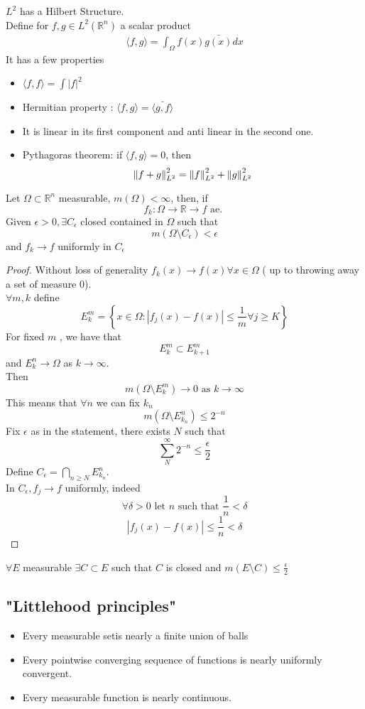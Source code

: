 \documentclass[../main.tex]{subfiles}
\begin{document}
\begin{rmq}
$L^{2}$ has a Hilbert Structure.\\
Define for $f,g\in L^{2}( \mathbb{R}^{n}) $ a scalar product
\begin{align*}
\langle f,g\rangle = \int_{ \Omega }^{  } f( x) \bar { g( x) } dx
\end{align*}
It has a few properties
\begin{itemize}
\item $ \langle f,f\rangle = \int |f|^{2}$ 
\item Hermitian property : $ \langle f,g \rangle = \bar  { \langle g,f \rangle } $ 
\item It is linear in its first component and anti linear in the second one.
\item Pythagoras theorem: if $ \langle f,g\rangle = 0$, then 
	\[ 
	\left\lVert f+g\right\rVert_{L^{2}} ^{2} = \left\lVert f\right\rVert_{L^{2}} ^{2} + \left\lVert g\right\rVert _{L^{2}} ^{2}
	\]
	
\end{itemize}


\end{rmq}
\begin{thm}
	Let $\Omega \subset \mathbb{R}^n$ measurable, $m( \Omega) < \infty $, then, if
	\[ 
	f_k : \Omega \to \mathbb{R} \longrightarrow f \text{ ae. } 
	\]
	Given $\epsilon >0,\exists C_\epsilon$ closed contained in $\Omega$ such that
	\[ 
	m( \Omega\setminus C_\epsilon) < \epsilon
	\]
	and $f_k\to f$ uniformly in $C_\epsilon$ 
\end{thm}
\begin{proof}
Without loss of generality $f_k( x) \to f( x) \forall x\in \Omega$ ( up to throwing away a set of measure 0).\\
$\forall m,k$ define
\[ 
E^{m}_k = \left\{ x\in \Omega : |f_j( x) - f( x) | \leq \frac{1}{m}\forall j \geq K \right\} 
\]
For fixed $m$ , we have that
\[ 
E^{m}_k \subset E^{m}_{k+1} 
\]
and $E^{n}_k \to \Omega$ as $k\to \infty $.\\
Then
\[ 
m( \Omega\setminus E^{m}_k ) \to 0 \text{ as } k\to \infty 
\]
This means that $\forall n$ we can fix $k_n$ 
\[ 
m( \Omega \setminus E_{k_n}^{n}) \leq 2^{-n}
\]
Fix $\epsilon$ as in the statement, there exists $N$ such that 
\[ 
\sum_N^{ \infty } 2^{-n} \leq \frac{\epsilon}{2}
\]
Define $C_\epsilon = \bigcap_{n \geq N} E^{n}_{k_n} $.\\
In $C_\epsilon, f_j \to f$ uniformly, indeed
\[ 
\forall \delta >0 \text{ let  } n \text{ such that } \frac{1}{n}< \delta
\]
\[ 
|f_j( x) - f( x) | \leq \frac{1}{n} < \delta	
\]


\end{proof}
\begin{rmq}
$\forall E$ measurable $\exists C \subset E$ such that $C$ is closed and $m( E\setminus C) \leq \frac{\epsilon}{2}$ 
\end{rmq}
\subsection*{"Littlehood principles"}
\begin{itemize}
\item Every measurable setis nearly a finite union of balls
\item Every pointwise converging sequence of functions is nearly uniformly convergent.
\item Every measurable function is nearly continuous.
\end{itemize}
\end{document}
